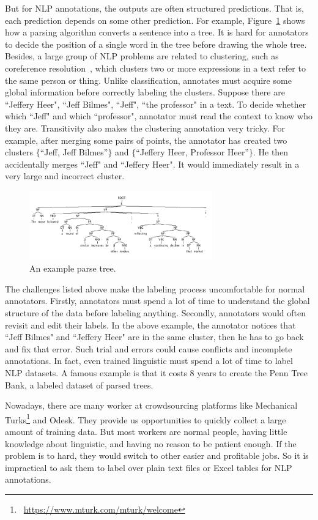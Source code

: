 But for NLP annotations, the outputs are often structured predictions.
That is, each prediction depends on some other prediction. For
example, Figure~\ref{fig:example_parse_tree} shows how a parsing
algorithm converts a sentence into a tree. It is hard for annotators
to decide the position of a single word in the tree before drawing the
whole tree. Besides, a large group of NLP problems are related to
clustering, such as coreference resolution~\cite{lee2011stanford},
which clusters two or more expressions in a text refer to the same
person or thing. Unlike classification, annotates must acquire some
global information before correctly labeling the clusters. Suppose
there are ``Jeffery Heer", ``Jeff Bilmes", ``Jeff", ``the professor"
in a text. To decide whether which ``Jeff" and which ``professor",
annotator must read the context to know who they are. Transitivity
also makes the clustering annotation very tricky. For example, after
merging some pairs of points, the annotator has created two clusters
$\{$``Jeff, Jeff Bilmes''$\}$ and $\{$``Jeffery Heer, Professor
Heer''$\}$. He then accidentally merges ``Jeff" and ``Jeffery Heer".
It would immediately result in a very large and incorrect cluster.


\begin{figure}
\centering
\includegraphics[width=3.1in]{figs/parsetree.png}
\caption{An example parse tree.}
\label{fig:example_parse_tree}
\end{figure}


The challenges listed above make the labeling process uncomfortable
for normal annotators. Firstly, annotators must spend a lot of time to
  understand the global structure of the data before labeling
  anything. Secondly, annotators would often revisit and edit their
  labels. In the above example, the annotator notices that ``Jeff
  Bilmes" and ``Jeffery Heer" are in the same cluster, then he has to
  go back and fix that error. Such trial and errors could cause
  conflicts and incomplete annotations. In fact, even trained
  linguistic must spend a lot of time to label NLP datasets. A famous
  example is that it costs 8 years to create the Penn Tree Bank, a
  labeled dataset of parsed trees. 

Nowadays, there are many worker at crowdsourcing platforms like
Mechanical Turks\footnote{~\url{https://www.mturk.com/mturk/welcome}}
and Odesk. They provide us opportunities to quickly collect a large
amount of training data. But most workers are normal people, having
little knowledge about linguistic, and having no reason to be patient
enough. If the problem is to hard, they would switch to other easier
and profitable jobs. So it is impractical to ask them to label over
plain text files or Excel tables for NLP annotations.  
